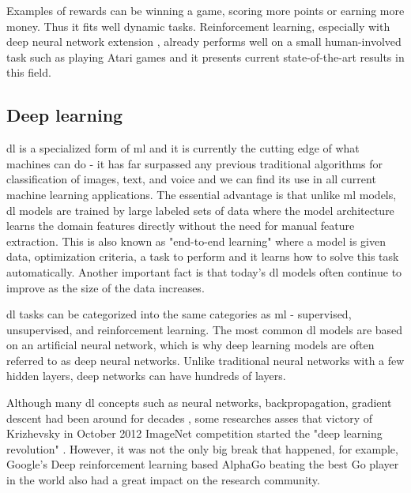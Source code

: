             Examples of rewards can be winning a game, scoring more points or earning more money. Thus it fits well dynamic tasks. Reinforcement learning, especially with deep neural network extension \cite{franccois2018introduction}, already performs well on a small human-involved task such as playing Atari games and it presents current state-of-the-art results in this field.
       
    \subsection{Deep learning}
        \Gls{dl} is a specialized form of \gls{ml} and it is currently the cutting edge of what machines can do - it has far surpassed any previous traditional algorithms for classification of images, text, and voice and we can find its use in all current machine learning applications. The essential advantage is that unlike \gls{ml} models, \Gls{dl} models are trained by large labeled sets of data where the model architecture learns the domain features directly without the need for manual feature extraction. This is also known as "end-to-end learning" where a model is given data, optimization criteria, a task to perform and it learns how to solve this task automatically. Another important fact is that today's \gls{dl} models often continue to improve as the size of the data increases.
        
        \Gls{dl} tasks can be categorized into the same categories as \gls{ml} - supervised, unsupervised, and reinforcement learning. The most common \gls{dl} models are based on an artificial neural network, which is why deep learning models are often referred to as deep neural networks. Unlike traditional neural networks with a few hidden layers, deep networks can have hundreds of layers.
        
        Although many \gls{dl} concepts such as neural networks, backpropagation, gradient descent had been around for decades \cite{fukushima1980neocognitron, lecun1989backpropagation, lecun1998gradient}, some researches asses that victory of Krizhevsky in October 2012 ImageNet competition started the "deep learning revolution" \cite{russakovsky2015imagenet}. However, it was not the only big break that happened, for example, Google’s Deep reinforcement learning based AlphaGo beating the best Go player in the world \cite{kochgo} also had a great impact on the research community. 
        
